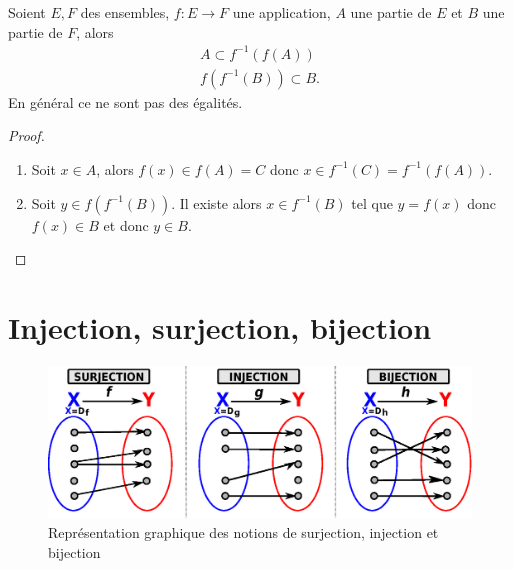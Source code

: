 %
\begin{prop}
  Soient $E,F$ des ensembles, $f:E\longrightarrow F$ une application, $A$ une partie de $E$ et $B$ une partie de $F$, alors
  \begin{gather}
    A \subset f^{-1}(f(A)) \\
    f(f^{-1}(B)) \subset B.
  \end{gather}
  En général ce ne sont pas des égalités.
\end{prop}
\begin{proof}
  \begin{enumerate}
  \item Soit $x \in A$, alors $f(x) \in f(A) = C$ donc $x \in f^{-1}(C)=f^{-1}(f(A))$.
  \item Soit $y \in f(f^{-1}(B))$. Il existe alors $x \in f^{-1}(B)$ tel que $y=f(x)$ donc $f(x) \in B$ et donc $y \in B$.
  \end{enumerate}
\end{proof}
%
\section{Injection, surjection, bijection}
\label{chap3-sec:injsurbij}
%
\begin{figure}
  \centering
  \includegraphics[scale=0.7, width=\textwidth]{Surjection_Injection_Bijection.eps}
  \caption[Surjection, injection et bijection]{Représentation graphique des notions de surjection, injection et bijection}
  \label{chap3-fig:surjinjbij}
\end{figure}
%
